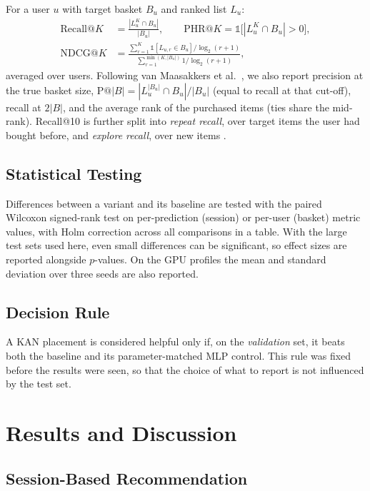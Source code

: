 \documentclass[12pt,a4paper]{report}
\begin{document}
For a user $u$ with target basket $B_u$ and ranked list $L_u$:
\begin{align}
\mathrm{Recall@}K &= \frac{|L_u^{K} \cap B_u|}{|B_u|}, \qquad
\mathrm{PHR@}K = \mathbb{1}\big[|L_u^{K} \cap B_u| > 0\big], \\
\mathrm{NDCG@}K &= \frac{\sum_{r=1}^{K} \mathbb{1}[L_{u,r} \in B_u] / \log_2(r+1)}{\sum_{r=1}^{\min(K, |B_u|)} 1/\log_2(r+1)},
\end{align}
averaged over users. Following van Maasakkers et al.\ \cite{vanmaasakkers2023},
we also report precision at the true basket size, $\mathrm{P@}|B| = |L_u^{|B_u|} \cap B_u| / |B_u|$
(equal to recall at that cut-off), recall at $2|B|$, and the average rank of the
purchased items (ties share the mid-rank). Recall@10 is further split into
\emph{repeat recall}, over target items the user had bought before, and
\emph{explore recall}, over new items \cite{li2023}.

\section{Statistical Testing}

Differences between a variant and its baseline are tested with the paired
Wilcoxon signed-rank test on per-prediction (session) or per-user (basket)
metric values, with Holm correction across all comparisons in a table. With the
large test sets used here, even small differences can be significant, so effect
sizes are reported alongside $p$-values. On the GPU profiles the mean and
standard deviation over three seeds are also reported.

\section{Decision Rule}

A KAN placement is considered helpful only if, on the \emph{validation} set, it
beats both the baseline and its parameter-matched MLP control. This rule was
fixed before the results were seen, so that the choice of what to report is not
influenced by the test set.

\chapter{Results and Discussion}
\label{ch:results}

\section{Session-Based Recommendation}
\end{document}
